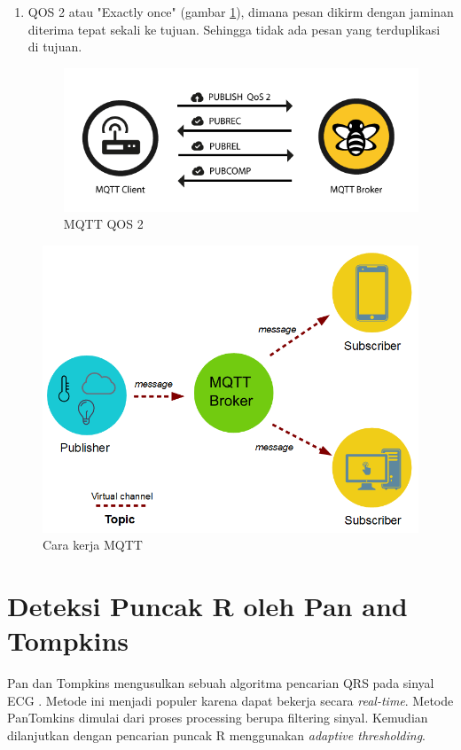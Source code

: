 \begin{enumerate}
	\item QOS 2 atau "Exactly once" (gambar \ref{fig:mqtt2}), dimana pesan dikirm dengan jaminan diterima tepat sekali ke tujuan. Sehingga tidak ada pesan yang terduplikasi di tujuan.	
	
\begin{figure}[H]
	\centering
	\includegraphics[scale=0.3]{images/qos2.png}	
	\caption{MQTT QOS 2}
	\label{fig:mqtt2}
\end{figure}
\end{enumerate}

\begin{figure}[H]
	\centering
	\includegraphics[scale=0.35]{images/mqtt.png}
	\caption{Cara kerja MQTT}
	\label{fig:how_mqtt}
\end{figure}

\section{Deteksi Puncak R oleh Pan and Tompkins}\label{bab2_pantom}
Pan dan Tompkins mengusulkan sebuah algoritma pencarian QRS pada sinyal ECG \cite{pantom}. Metode ini menjadi populer karena dapat bekerja secara \textit{real-time}. Metode PanTomkins dimulai dari proses processing berupa filtering sinyal. Kemudian dilanjutkan dengan pencarian puncak R menggunakan \textit{adaptive thresholding}. 

